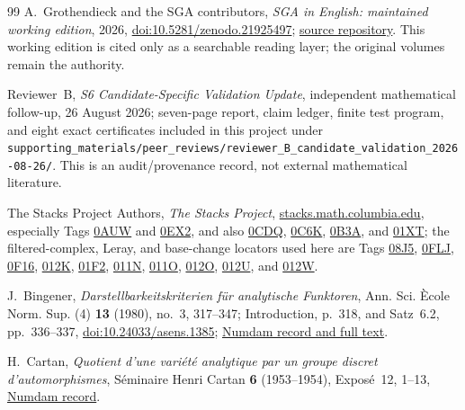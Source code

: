 \begin{thebibliography}{99}
A.~Grothendieck and the SGA contributors,
\emph{SGA in English: maintained working edition}, 2026,
\href{https://doi.org/10.5281/zenodo.21925497}{doi:10.5281/zenodo.21925497};
\href{https://github.com/KokunoYumeto/sga-en}{source repository}.
This working edition is cited only as a searchable reading layer; the
original volumes remain the authority.

Reviewer~B,
\emph{S6 Candidate-Specific Validation Update}, independent mathematical
follow-up, 26 August 2026; seven-page report, claim ledger, finite test
program, and eight exact certificates included in this project under
\nolinkurl{supporting_materials/peer_reviews/reviewer_B_candidate_validation_2026-08-26/}.
This is an audit/provenance record, not external mathematical literature.

The Stacks Project Authors,
\emph{The Stacks Project},
\href{https://stacks.math.columbia.edu}{stacks.math.columbia.edu},
especially Tags
\href{https://stacks.math.columbia.edu/tag/0AUW}{0AUW} and
\href{https://stacks.math.columbia.edu/tag/0EX2}{0EX2}, and also
\href{https://stacks.math.columbia.edu/tag/0CDQ}{0CDQ},
\href{https://stacks.math.columbia.edu/tag/0C6K}{0C6K},
\href{https://stacks.math.columbia.edu/tag/0B3A}{0B3A}, and
\href{https://stacks.math.columbia.edu/tag/01XT}{01XT}; the filtered-complex,
Leray, and base-change locators used here are Tags
\href{https://stacks.math.columbia.edu/tag/08J5}{08J5},
\href{https://stacks.math.columbia.edu/tag/0FLJ}{0FLJ},
\href{https://stacks.math.columbia.edu/tag/0F16}{0F16},
\href{https://stacks.math.columbia.edu/tag/012K}{012K},
\href{https://stacks.math.columbia.edu/tag/01F2}{01F2},
\href{https://stacks.math.columbia.edu/tag/011N}{011N},
\href{https://stacks.math.columbia.edu/tag/011O}{011O},
\href{https://stacks.math.columbia.edu/tag/012O}{012O},
\href{https://stacks.math.columbia.edu/tag/012U}{012U}, and
\href{https://stacks.math.columbia.edu/tag/012W}{012W}.

J.~Bingener,
\emph{Darstellbarkeitskriterien f\"ur analytische Funktoren},
Ann. Sci. \`Ecole Norm. Sup. (4) \textbf{13} (1980), no.~3, 317--347;
Introduction, p.~318, and Satz~6.2, pp.~336--337,
\href{https://doi.org/10.24033/asens.1385}{doi:10.24033/asens.1385};
\href{https://www.numdam.org/item/ASENS_1980_4_13_3_317_0/}%
{Numdam record and full text}.

H.~Cartan,
\emph{Quotient d'une vari\'et\'e analytique par un groupe discret
d'automorphismes},
S\'eminaire Henri Cartan \textbf{6} (1953--1954), Expos\'e~12, 1--13,
\href{https://www.numdam.org/item/SHC_1953-1954__6__A12_0/}{Numdam record}.


\end{thebibliography}
